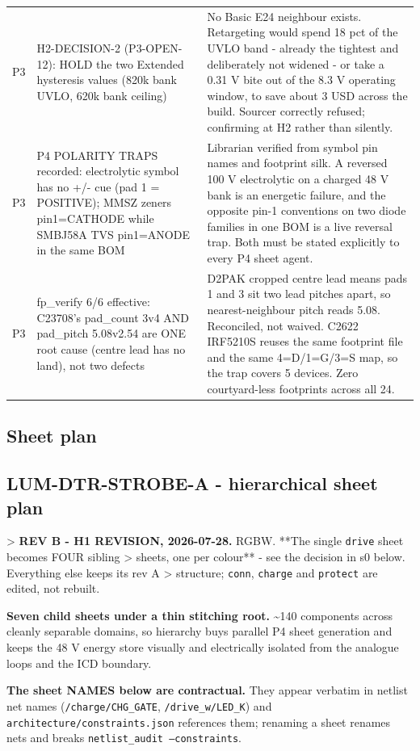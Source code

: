 \documentclass[11pt,a4paper]{article}
\begin{document}
{\begin{longtable}{lp{5.2cm}p{7.2cm}}
P3 & H2-DECISION-2 (P3-OPEN-12): HOLD the two Extended hysteresis values (820k bank UVLO, 620k bank ceiling) & No Basic E24 neighbour exists. Retargeting would spend 18 pct of the UVLO band - already the tightest and deliberately not widened - or take a 0.31 V bite out of the 8.3 V operating window, to save about 3 USD across the build. Sourcer correctly refused; confirming at H2 rather than silently. \\
P3 & P4 POLARITY TRAPS recorded: electrolytic symbol has no +/- cue (pad 1 = POSITIVE); MMSZ zeners pin1=CATHODE while SMBJ58A TVS pin1=ANODE in the same BOM & Librarian verified from symbol pin names and footprint silk. A reversed 100 V electrolytic on a charged 48 V bank is an energetic failure, and the opposite pin-1 conventions on two diode families in one BOM is a live reversal trap. Both must be stated explicitly to every P4 sheet agent. \\
P3 & fp\_verify 6/6 effective: C23708's pad\_count 3v4 AND pad\_pitch 5.08v2.54 are ONE root cause (centre lead has no land), not two defects & D2PAK cropped centre lead means pads 1 and 3 sit two lead pitches apart, so nearest-neighbour pitch reads 5.08. Reconciled, not waived. C2622 IRF5210S reuses the same footprint file and the same 4=D/1=G/3=S map, so the trap covers 5 devices. Zero courtyard-less footprints across all 24. \\
\bottomrule
\end{longtable}
}
\subsection*{Sheet plan}
\subsection*{LUM-DTR-STROBE-A - hierarchical sheet plan}
\textgreater{} \textbf{REV B - H1 REVISION, 2026-07-28.} RGBW. {*}{*}The single \texttt{drive} sheet becomes FOUR sibling \textgreater{} sheets, one per colour{*}{*} - see the decision in s0 below. Everything else keeps its rev A \textgreater{} structure; \texttt{conn}, \texttt{charge} and \texttt{protect} are edited, not rebuilt.

\textbf{Seven child sheets under a thin stitching root.} \textasciitilde{}140 components across cleanly separable domains, so hierarchy buys parallel P4 sheet generation and keeps the 48 V energy store visually and electrically isolated from the analogue loops and the ICD boundary.

\textbf{The sheet NAMES below are contractual.} They appear verbatim in netlist net names (\texttt{/charge/CHG\_GATE}, \texttt{/drive\_w/LED\_K}) and \texttt{architecture/constraints.json} references them; renaming a sheet renames nets and breaks \texttt{netlist\_audit --constraints}.
\end{document}
